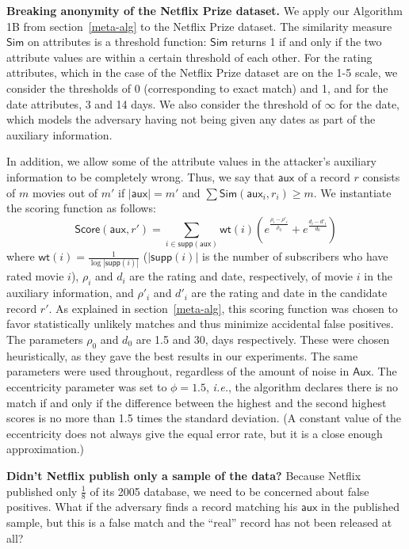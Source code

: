 \documentclass[11pt]{article}
\newcommand{\ie}{\emph{i.e.}}
\newcommand{\Sim}{\textsf{Sim}}
\newcommand{\Aux}{\textsf{Aux}}
\newcommand{\aux}{\textsf{aux}}
\newcommand{\wt}{\textsf{wt}}
\newcommand{\supp}{\textsf{supp}}
\newcommand{\score}{\textsf{Score}}
\begin{document}
\vspace{1ex}
\noindent
\textbf{Breaking anonymity of the Netflix Prize dataset.}
We apply our Algorithm 1B from section~\ref{meta-alg} to the Netflix
Prize dataset.  The similarity measure $\Sim$ on attributes is a threshold
function: $\Sim$ returns 1 if and only if the two attribute values are
within a certain threshold of each other.  For the rating attributes,
which in the case of the Netflix Prize dataset are on the 1-5 scale, we
consider the thresholds of 0 (corresponding to exact match) and 1, and
for the date attributes, 3 and 14 days. We also consider the threshold
of $\infty$ for the date, which models the adversary having not being
given any dates as part of the auxiliary information.

In addition, we allow some of the attribute values in the attacker's auxiliary
information to be completely wrong. Thus, we say that $\aux$ of a
record $r$ consists of $m$ movies out of $m'$ if $|\aux| = m'$ and 
$\sum \Sim(\aux_i, r_i) \geq m$.
We instantiate the scoring function as follows:
$$
\score(\aux,r') = {\sum_{i \in \supp(\aux)} \wt(i)(e^{\frac{\rho_i-\rho'_i}{\rho_0}}+e^{\frac{d_i-d'_i}{d_0}})}
$$
where $\wt(i) = \frac 1 {\log |\supp(i)|}$ ($|\supp(i)|$ is the number
of subscribers who have rated movie $i$), $\rho_i$  and $d_i$ are the
rating and date, respectively, of movie $i$ in the auxiliary information,
and $\rho'_i$  and $d'_i$ are the rating and date in the candidate
record $r'$.  As explained in section~\ref{meta-alg}, this scoring
function was chosen to favor statistically unlikely matches and thus
minimize accidental false positives.  The parameters $\rho_0$ and $d_0$
are 1.5 and 30, days respectively.  These were chosen heuristically,
as they gave the best results in our experiments.  The same parameters
were used throughout, regardless of the amount of noise in $\Aux$.
The eccentricity parameter was set to $\phi=1.5$, \ie, the algorithm
declares there is no match if and only if the difference between the
highest and the second highest scores is no more than 1.5 times the
standard deviation. (A constant value of the eccentricity does not always
give the equal error rate, but it is a close enough approximation.)


\vspace{1ex}
\noindent
\textbf{Didn't Netflix publish only a sample of the data?}
Because Netflix published only $\frac{1}{8}$ of its 2005 database,
we need to be concerned about false positives.  What if the adversary
finds a record matching his $\aux$ in the published sample, but this is
a false match and the ``real'' record has not been released at all?
\end{document}
